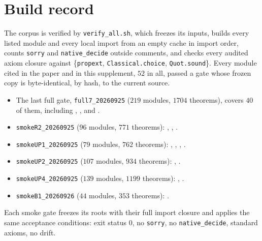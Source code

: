 \section*{Build record}
The corpus is verified by \texttt{verify\_all.sh}, which freezes its inputs, builds every listed
module and every local import from an empty cache in import order, counts \texttt{sorry} and
\texttt{native\_decide} outside comments, and checks every audited axiom closure against
\{\texttt{propext}, \texttt{Classical.choice}, \texttt{Quot.sound}\}. Every module cited in the
paper and in this supplement, $52$ in all, passed a gate whose frozen copy is byte-identical, by
hash, to the current source.
\begin{itemize}
\item The last full gate, \texttt{full7\_20260925} ($219$ modules, $1704$ theorems), covers $40$ of
them, including , ,
 and .
\item \texttt{smokeR2\_20260925} ($96$ modules, $771$ theorems): ,
, .
\item \texttt{smokeUP1\_20260925} ($79$ modules, $762$ theorems):
, , ,
.
\item \texttt{smokeUP2\_20260925} ($107$ modules, $934$ theorems): ,
.
\item \texttt{smokeUP4\_20260925} ($139$ modules, $1199$ theorems): ,
.
\item \texttt{smokeB1\_20260926} ($44$ modules, $353$ theorems): .
\end{itemize}
Each smoke gate freezes its roots with their full import closure and applies the same
acceptance conditions: exit status $0$, no \texttt{sorry}, no \texttt{native\_decide}, standard
axioms, no drift.

